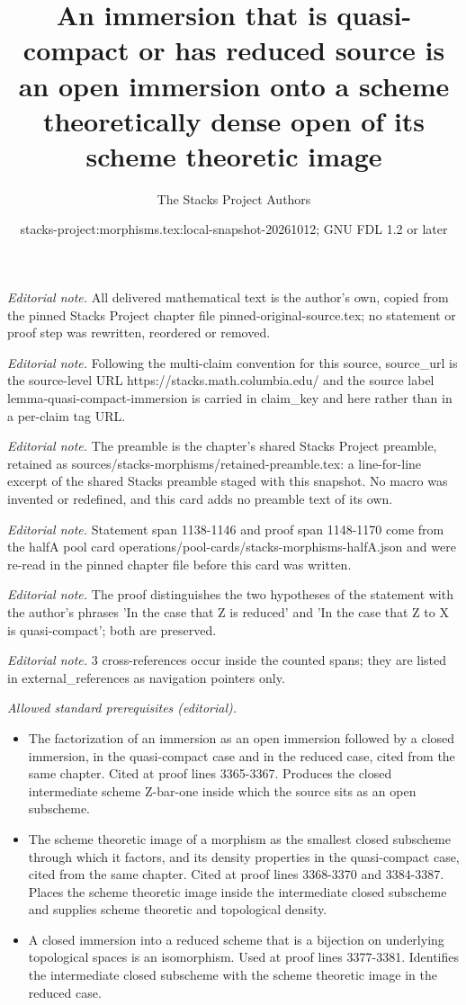 \documentclass[10pt,a4paper]{amsart}
\title{An immersion that is quasi-compact or has reduced source is an open immersion onto a scheme theoretically dense open of its scheme theoretic image}
\author{The Stacks Project Authors}
\date{stacks-project:morphisms.tex:local-snapshot-20261012; GNU FDL 1.2 or later}
\theoremstyle{plain}
\theoremstyle{definition}
\theoremstyle{remark}
\numberwithin{equation}{subsection}
\begin{document}
\maketitle
\noindent\textit{Editorial note.} All delivered mathematical text is the author's own, copied from the pinned Stacks Project chapter file pinned-original-source.tex; no statement or proof step was rewritten, reordered or removed.\par\medskip
\noindent\textit{Editorial note.} Following the multi-claim convention for this source, source\_url is the source-level URL https://stacks.math.columbia.edu/ and the source label lemma-quasi-compact-immersion is carried in claim\_key and here rather than in a per-claim tag URL.\par\medskip
\noindent\textit{Editorial note.} The preamble is the chapter's shared Stacks Project preamble, retained as sources/stacks-morphisms/retained-preamble.tex: a line-for-line excerpt of the shared Stacks preamble staged with this snapshot. No macro was invented or redefined, and this card adds no preamble text of its own.\par\medskip
\noindent\textit{Editorial note.} Statement span 1138-1146 and proof span 1148-1170 come from the halfA pool card operations/pool-cards/stacks-morphisms-halfA.json and were re-read in the pinned chapter file before this card was written.\par\medskip
\noindent\textit{Editorial note.} The proof distinguishes the two hypotheses of the statement with the author's phrases 'In the case that Z is reduced' and 'In the case that Z to X is quasi-compact'; both are preserved.\par\medskip
\noindent\textit{Editorial note.} 3 cross-references occur inside the counted spans; they are listed in external\_references as navigation pointers only.\par\medskip
\noindent\textit{Allowed standard prerequisites (editorial).}\begin{itemize}
\item The factorization of an immersion as an open immersion followed by a closed immersion, in the quasi-compact case and in the reduced case, cited from the same chapter. Cited at proof lines 3365-3367. Produces the closed intermediate scheme Z-bar-one inside which the source sits as an open subscheme.
\item The scheme theoretic image of a morphism as the smallest closed subscheme through which it factors, and its density properties in the quasi-compact case, cited from the same chapter. Cited at proof lines 3368-3370 and 3384-3387. Places the scheme theoretic image inside the intermediate closed subscheme and supplies scheme theoretic and topological density.
\item A closed immersion into a reduced scheme that is a bijection on underlying topological spaces is an isomorphism. Used at proof lines 3377-3381. Identifies the intermediate closed subscheme with the scheme theoretic image in the reduced case.
\end{itemize}\medskip
\end{document}
